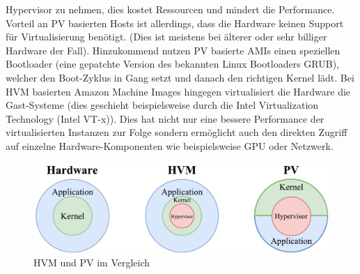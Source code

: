 \documentclass[titlepage]{report}
\begin{document}
Hypervisor zu nehmen, dies kostet Ressourcen und mindert die
Performance. Vorteil an PV basierten Hosts ist allerdings, dass die
Hardware keinen Support für Virtualisierung benötigt. (Dies ist meistens
bei älterer oder sehr billiger Hardware der Fall). Hinzukommend nutzen
PV basierte AMIs einen speziellen Bootloader (eine gepatchte Version des
bekannten Linux Bootloaders GRUB), welcher den Boot\hyp{}Zyklus in
Gang setzt und danach den richtigen Kernel
lädt.\cite{virtualization} Bei HVM basierten Amazon Machine Images
hingegen virtualisiert die Hardware die Gast\hyp{}Systeme (dies geschieht
beispielsweise durch die Intel Virtualization Technology (Intel VT\hyp{}x)).
Dies hat nicht nur eine bessere Performance der virtualisierten
Instanzen zur Folge sondern ermöglicht auch den direkten Zugriff auf
einzelne Hardware\hyp{}Komponenten wie beispielsweise GPU oder Netzwerk.
\begin{figure}[h]
    \centering
    \includegraphics[width=1.0\textwidth]{figures/hvm_pv.pdf}
    \caption{HVM und PV im Vergleich}\label{fig:5}
\end{figure}
\end{document}

